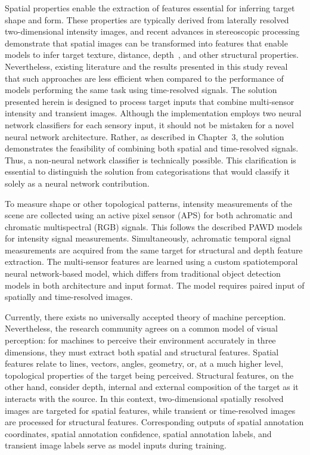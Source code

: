 \documentclass[12pt,a4paper,oneside]{report}
\begin{document}
Spatial properties enable the extraction of features essential for inferring target shape and form. These properties are typically derived from laterally resolved two-dimensional intensity images, and recent advances in stereoscopic processing demonstrate that spatial images can be transformed into features that enable models to infer target texture, distance, depth~\cite{depthpro2024}, and other structural properties. Nevertheless, existing literature and the results presented in this study reveal that such approaches are less efficient when compared to the performance of models performing the same task using time-resolved signals. The solution presented herein is designed to process target inputs that combine multi-sensor intensity and transient images. Although the implementation employs two neural network classifiers for each sensory input, it should not be mistaken for a novel neural network architecture. Rather, as described in Chapter~3, the solution demonstrates the feasibility of combining both spatial and time-resolved signals. Thus, a non-neural network classifier is technically possible. This clarification is essential to distinguish the solution from categorisations that would classify it solely as a neural network contribution.

To measure shape or other topological patterns, intensity measurements of the scene are collected using an active pixel sensor (APS) for both achromatic and chromatic multispectral (RGB) signals. This follows the described PAWD models for intensity signal measurements. Simultaneously, achromatic temporal signal measurements are acquired from the same target for structural and depth feature extraction. The multi-sensor features are learned using a custom spatiotemporal neural network-based model, which differs from traditional object detection models in both architecture and input format. The model requires paired input of spatially and time-resolved images.

Currently, there exists no universally accepted theory of machine perception. Nevertheless, the research community agrees on a common model of visual perception: for machines to perceive their environment accurately in three dimensions, they must extract both spatial and structural features. Spatial features relate to lines, vectors, angles, geometry, or, at a much higher level, topological properties of the target being perceived. Structural features, on the other hand, consider depth, internal and external composition of the target as it interacts with the source. In this context, two-dimensional spatially resolved images are targeted for spatial features, while transient or time-resolved images are processed for structural features. Corresponding outputs of spatial annotation coordinates, spatial annotation confidence, spatial annotation labels, and transient image labels serve as model inputs during training.
\end{document}
